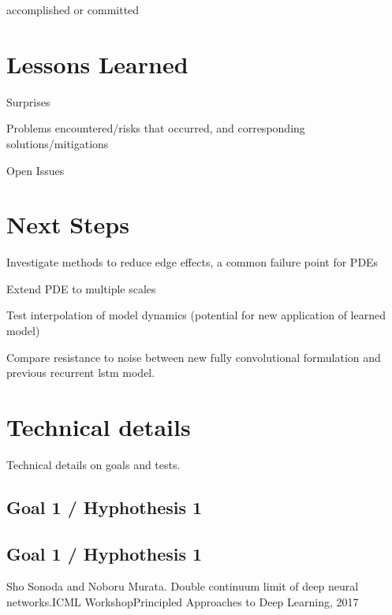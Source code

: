 \documentclass[12pt]{article}
\theoremstyle{plain}
\theoremstyle{remark}
\theoremstyle{definition}
\begin{document}
accomplished or committed

\section{Lessons Learned}

\noindent Surprises

\noindent Problems encountered/risks that occurred, and corresponding solutions/mitigations

\noindent Open Issues

\section{Next Steps}

\noindent Investigate methods to reduce edge effects, a common failure point for PDEs

\noindent Extend PDE to multiple scales

\noindent Test interpolation of model dynamics (potential for new application of learned model)

\noindent Compare resistance to noise between new fully convolutional formulation and previous recurrent lstm model.

\section{Technical details}

Technical details on goals and tests.

\subsection{Goal 1 / Hyphothesis 1}

\subsection{Goal 1 / Hyphothesis 1}



Sho Sonoda and Noboru Murata. Double continuum limit of deep neural networks.ICML WorkshopPrincipled Approaches to Deep Learning, 2017
\end{document}
